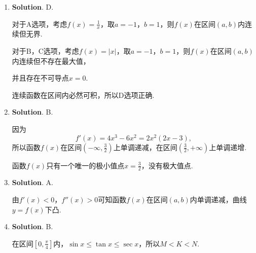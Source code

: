 \documentclass[../main.tex]{subfiles}
\begin{document}
\begin{enumerate}
    \item \textbf{Solution}. D.

          对于A选项，考虑$f(x)=\frac{1}{x}$，取$a=-1$，$b=1$，则$f(x)$在区间$(a,b)$内连续但无界.

          对于B，C选项，考虑$f(x)=|x|$，取$a=-1$，$b=1$，则$f(x)$在区间$(a,b)$内连续但不存在最大值，

          并且存在不可导点$x=0$.

          连续函数在区间内必然可积，所以D选项正确.

    \item \textbf{Solution}. B.

          因为
          \[
              f'(x)=4x^{3}-6x^{2}=2x^{2}(2x-3),
          \]
          所以函数$f(x)$在区间$\left(-\infty,\frac{3}{2}\right)$上单调递减，在区间$\left
              (\frac{3}{2},+\infty\right)$上单调递增.

          函数$f(x)$只有一个唯一的极小值点$x=\frac{3}{2}$，没有极大值点.

    \item \textbf{Solution}. A.

          由$f'(x)<0$，$f''(x)>0$可知函数$f(x)$在区间$(a,b)$内单调递减，曲线$y=f(x)$下凸.

    \item \textbf{Solution}. B.

          在区间$\left[0,\frac{\pi}{4}\right]$内，$\sin x\leq \tan x\leq \sec x$，所以$M<K<N$.
\end{enumerate}
\end{document}
